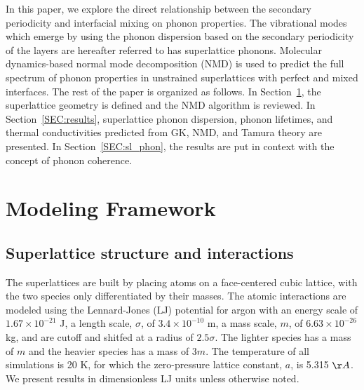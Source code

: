 \documentclass[aps,prb,preprint,preprintnumbers,amsmath,amssymb,floatfix,superscriptaddress]{revtex4}
\begin{document}

In this paper, we explore the direct relationship between the secondary periodicity and interfacial mixing on phonon properties. The vibrational modes which emerge by using the phonon dispersion based on the secondary periodicity of the layers are hereafter referred to has superlattice phonons. Molecular dynamics-based normal mode decomposition (NMD) is used to predict the full spectrum of phonon properties in unstrained superlattices with perfect and mixed interfaces. The rest of the paper is organized as follows. In Section~\ref{SEC:modeling}, the superlattice geometry is defined and the NMD algorithm is reviewed. In Section~\ref{SEC:results}, superlattice phonon dispersion, phonon lifetimes, and thermal conductivities predicted from GK, NMD, and Tamura theory are presented. In Section~\ref{SEC:sl_phon}, the results are put in context with the concept of phonon coherence.


\section{Modeling Framework}\label{SEC:modeling}
\subsection{Superlattice structure and interactions}\label{SEC:sl_struc}
The superlattices are built by placing atoms on a face-centered cubic lattice, with the two species only differentiated by their masses. The atomic interactions are modeled using the Lennard-Jones (LJ) potential for argon with an energy scale of $1.67\times10^{-21}$ J, a length scale, $\sigma$, of $3.4\times10^{-10}$ m, a mass scale, $m$, of $6.63\times10^{-26}$ kg, and are cutoff and shitfed at a radius of $2.5\sigma$. The lighter species has a mass of $m$ and the heavier species has a mass of $3m$. The temperature of all simulations is 20 K, for which the zero-pressure lattice constant, $a$, is 5.315 $\AA$.\cite{mcgaugheythesis} We present results in  dimensionless LJ units unless otherwise noted. 
\end{document}
